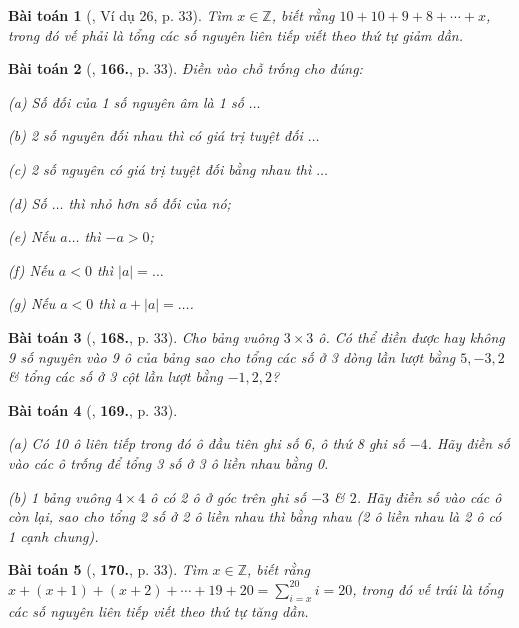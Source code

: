 \documentclass{article}
\numberwithin{equation}{section}
\newtheorem{baitoan}{Bài toán}[section]
\begin{document}
\begin{baitoan}[\cite{Binh_Toan_6_tap_1}, Ví dụ 26, p. 33]
	Tìm $x\in\mathbb{Z}$, biết rằng $10 + 10 + 9 + 8 + \cdots + x$, trong đó vế phải là tổng các số nguyên liên tiếp viết theo thứ tự giảm dần.
\end{baitoan}

\begin{baitoan}[\cite{Binh_Toan_6_tap_1}, \textbf{166.}, p. 33]
	Điền vào chỗ trống cho đúng:
	\begin{enumerate*}
		\item[(a)] Số đối của 1 số nguyên âm là 1 số $\ldots$
		\item[(b)] 2 số nguyên đối nhau thì có giá trị tuyệt đối $\ldots$
		\item[(c)] 2 số nguyên có giá trị tuyệt đối bằng nhau thì $\ldots$
		\item[(d)] Số $\ldots$ thì nhỏ hơn số đối của nó;
		\item[(e)] Nếu $a\ldots$ thì $-a > 0$;
		\item[(f)] Nếu $a < 0$ thì $|a| = \ldots$
		\item[(g)] Nếu $a < 0$ thì $a + |a| = \ldots$.
	\end{enumerate*}
\end{baitoan}

\begin{baitoan}[\cite{Binh_Toan_6_tap_1}, \textbf{168.}, p. 33]
	Cho bảng vuông $3\times 3$ ô. Có thể điền được hay không 9 số nguyên vào 9 ô của bảng sao cho tổng các số ở 3 dòng lần lượt bằng $5,-3,2$ \& tổng các số ở 3 cột lần lượt bằng $-1,2,2$?
\end{baitoan}	

\begin{baitoan}[\cite{Binh_Toan_6_tap_1}, \textbf{169.}, p. 33]
	\begin{enumerate*}
		\item[(a)] Có 10 ô liên tiếp trong đó ô đầu tiên ghi số 6, ô thứ 8 ghi số $-4$. Hãy điền số vào các ô trống để tổng 3 số ở 3 ô liền nhau bằng 0.
		\item[(b)] 1 bảng vuông $4\times 4$ ô có 2 ô ở góc trên ghi số $-3$ \& $2$. Hãy điền số vào các ô còn lại, sao cho tổng 2 số ở 2 ô liền nhau thì bằng nhau (2 ô liền nhau là 2 ô có 1 cạnh chung).
	\end{enumerate*}
\end{baitoan}

\begin{baitoan}[\cite{Binh_Toan_6_tap_1}, \textbf{170.}, p. 33]
	Tìm $x\in\mathbb{Z}$, biết rằng $x + (x + 1) + (x + 2) + \cdots + 19 + 20 = \sum_{i=x}^{20} i = 20$, trong đó vế trái là tổng các số nguyên liên tiếp viết theo thứ tự tăng dần.
\end{baitoan}
\end{document}
